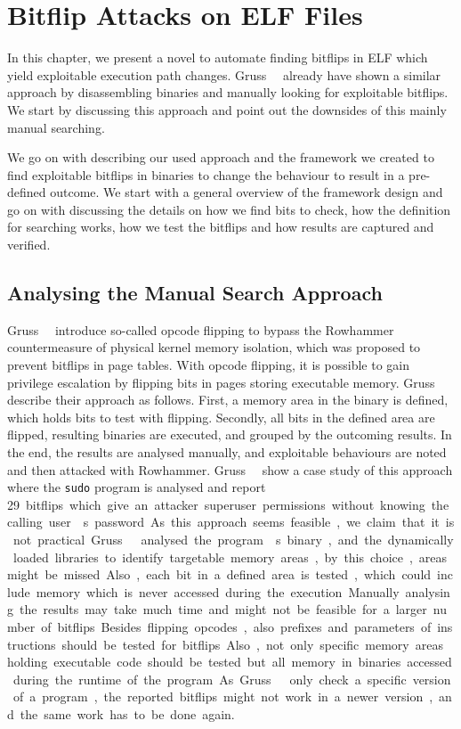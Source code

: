 \chapter{Bitflip Attacks on ELF Files}\label{sec:elfattack}

In this chapter, we present a novel to automate finding bitflips in ELF which
yield exploitable execution path changes. Gruss~\etal~\cite{flipinthewall}
already have shown a similar approach by disassembling binaries and manually
looking for exploitable bitflips. We start by discussing this approach and
point out the downsides of this mainly manual searching.

We go on with describing our used approach and the framework we created to
find exploitable bitflips in binaries to change the behaviour to result in
a pre-defined outcome. We start with a general overview of the framework design
and go on with discussing the details on how we find bits to check, how the
definition for searching works, how we test the bitflips and how results are
captured and verified.

\section{Analysing the Manual Search Approach}

Gruss~\etal~\cite{flipinthewall} introduce so-called opcode flipping to bypass
the Rowhammer countermeasure of physical kernel memory isolation, which was
proposed to prevent bitflips in page tables. With opcode flipping, it is
possible to gain privilege escalation by flipping bits in pages storing
executable memory. Gruss~\etal~\cite{flipinthewall} describe their approach as
follows. First, a memory area in the binary is defined, which holds bits to
test with flipping. Secondly, all bits in the defined area are flipped,
resulting binaries are executed, and grouped by the outcoming results. In the
end, the results are analysed manually, and exploitable behaviours are noted and
then attacked with Rowhammer. Gruss~\etal~\cite{flipinthewall} show a case study
of this approach where the \texttt{sudo} program is analysed and report \SI{29}
bitflips which give an attacker superuser permissions without knowing the
calling user\textquotesingle s password.

As this approach seems feasible, we claim that it is not practical.
Gruss~\etal~\cite{flipinthewall} analysed the program\textquotesingle s binary,
and the dynamically loaded libraries to identify targetable memory areas, by
this choice, areas might be missed. Also, each bit in a defined area is tested,
which could include memory which is never accessed during the execution.
Manually analysing the results may take much time and might not be feasible for
a larger number of bitflips. Besides flipping opcodes, also prefixes and
parameters of instructions should be tested for bitflips. Also, not only
specific memory areas holding executable code should be tested but all memory in
binaries accessed during the runtime of the program. As
Gruss~\etal~\cite{flipinthewall} only check a specific version of a program, the
reported bitflips might not work in a newer version, and the same work has to be
done again.

